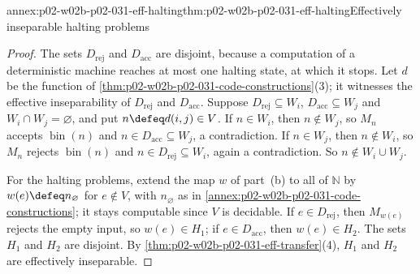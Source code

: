 \begin{annexitem}{annex:p02-w02b-p02-031-eff-halting}{thm:p02-w02b-p02-031-eff-halting}{Effectively inseparable halting problems}
\begin{proof}
The sets \(D_{\mathrm{rej}}\) and \(D_{\mathrm{acc}}\) are disjoint, because a
computation of a deterministic machine reaches at most one halting state, at
which it stops.  Let \(d\) be the function of
\cref{thm:p02-w02b-p02-031-code-constructions}(3); it witnesses the effective
inseparability of \(D_{\mathrm{rej}}\) and \(D_{\mathrm{acc}}\).  Suppose
\(D_{\mathrm{rej}}\subseteq W_i\), \(D_{\mathrm{acc}}\subseteq W_j\) and
\(W_i\cap W_j=\varnothing\), and put \(n\defeq d(i,j)\in V\).  If \(n\in W_i\),
then \(n\notin W_j\), so \(M_n\) accepts \(\operatorname{bin}(n)\) and \(n\in
D_{\mathrm{acc}}\subseteq W_j\), a contradiction.  If \(n\in W_j\), then
\(n\notin W_i\), so \(M_n\) rejects \(\operatorname{bin}(n)\) and \(n\in
D_{\mathrm{rej}}\subseteq W_i\), again a contradiction.  So \(n\notin W_i\cup
W_j\).

For the halting problems, extend the map \(w\) of part~(b) to all of
\(\mathbb N\) by \(w(e)\defeq n_\varnothing\) for \(e\notin V\), with
\(n_\varnothing\) as in \cref{annex:p02-w02b-p02-031-code-constructions}; it
stays computable since \(V\) is decidable.  If \(e\in D_{\mathrm{rej}}\), then
\(M_{w(e)}\) rejects the empty input, so \(w(e)\in H_1\); if \(e\in
D_{\mathrm{acc}}\), then \(w(e)\in H_2\).  The sets \(H_1\) and \(H_2\) are
disjoint.  By \cref{thm:p02-w02b-p02-031-eff-transfer}(4), \(H_1\) and \(H_2\)
are effectively inseparable.
\end{proof}
\end{annexitem}


